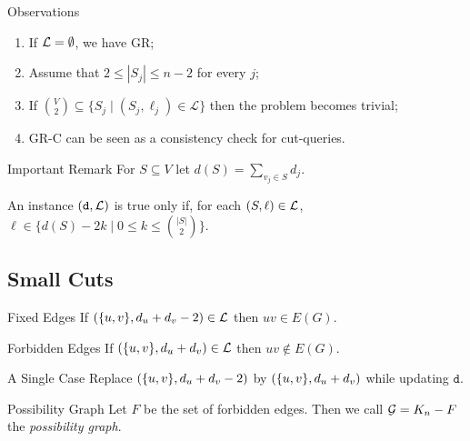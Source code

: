\begin{frame}{Observations}
    \begin{enumerate}[-]

    \item If $\mathcal{L} = \emptyset$, we have GR;

    \item Assume that $2 \le |S_j| \le n-2$ for every $j$;

    \item If $\binom{V}{2} \subseteq \{S_j \mid (S_j, \ell_j) \in \mathcal{L}\} $ then the problem becomes trivial;

    \item GR-C can be seen as a consistency check for cut-queries.

  \end{enumerate}
\end{frame}

\begin{frame}{Important Remark}
    \centering
    For $S \subseteq V$ let $d(S) = \sum\limits_{v_j \in S} d_j$.
    \bigbreak
    \pause
    \begin{remark}[1]
        An instance $(\texttt{d}, \mathcal{L})$ is true only if, for each $(S, \ell) \in \mathcal{L}$,
        \pause
        $\ell \in \{ d(S) - 2k \mid 0 \leq k \leq \binom{|S|}{2} \}$.
    \end{remark}
\end{frame}

\subsection{Small Cuts}

\begin{frame}{Fixed Edges}
    \centering
    If $(\{u, v\}, d_u + d_v - 2) \in \mathcal{L}$ then $uv \in E(G)$.
\end{frame}

\begin{frame}{Forbidden Edges}
    \centering
    If $(\{u, v\}, d_u + d_v) \in \mathcal{L}$ then $uv \notin E(G)$.
\end{frame}

\begin{frame}{A Single Case}
    \centering
    Replace $(\{u, v\}, d_u + d_v - 2)$ by $(\{u, v\}, d_u + d_v)$ while updating $\texttt{d}$.
\end{frame}

\begin{frame}{Possibility Graph}
    \centering
    Let $F$ be the set of forbidden edges.
    \pause
    \bigbreak
    Then we call $\mathcal{G} = K_n - F$ the \emph{possibility graph}.
\end{frame}

